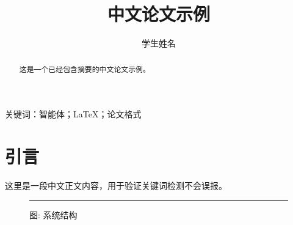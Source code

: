 \documentclass{article}
\title{中文论文示例}
\author{学生姓名}
\begin{document}
\maketitle

\begin{abstract}
这是一个已经包含摘要的中文论文示例。
\end{abstract}

关键词：智能体；LaTeX；论文格式

\section{引言}
这里是一段中文正文内容，用于验证关键词检测不会误报。

\begin{figure}[htbp]
\centering
\rule{5cm}{3cm}
\caption{图: 系统结构}
\end{figure}



\end{document}
